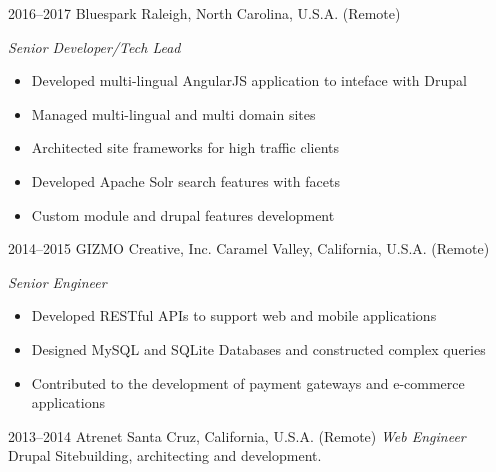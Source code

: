 \documentclass[]{friggeri-cv} %
\begin{document}
\begin{entrylist}
\entry
{2016--2017}
{Bluespark}
{Raleigh, North Carolina, U.S.A. (Remote)}
{\emph{Senior Developer/Tech Lead}
\begin{itemize}
\item Developed multi-lingual AngularJS application to inteface with Drupal
\item Managed multi-lingual and multi domain sites
\item Architected site frameworks for high traffic clients
\item Developed Apache Solr search features with facets
\item Custom module and drupal features development
\end{itemize}}

\entry
{2014--2015}
{GIZMO Creative, Inc.}
{Caramel Valley, California, U.S.A. (Remote)}
{\emph{Senior Engineer}
\begin{itemize}
\item Developed RESTful APIs to support web and mobile applications
\item Designed MySQL and SQLite Databases and constructed complex queries
\item Contributed to the development of payment gateways and e-commerce applications
\end{itemize}}
\entry
{2013--2014}
{Atrenet}
{Santa Cruz, California, U.S.A. (Remote)}
{\emph{Web Engineer}
Drupal Sitebuilding, architecting and development.
}
\end{entrylist}
\end{document}
